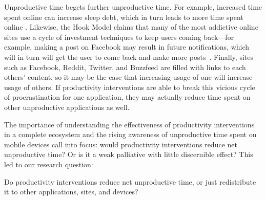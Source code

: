 


Unproductive time begets further unproductive time. For example, increased time spent online can increase sleep debt, which in turn leads to more time spent online \cite{Mark:2016:SDS:2858036.2858437}. Likewise, the Hook Model claims that many of the most addictive online sites use a cycle of investment techniques to keep users coming back---for example, making a post on Facebook may result in future notifications, which will in turn will get the user to come back and make more posts~\cite{eyal2014hooked}. Finally, sites such as Facebook, Reddit, Twitter, and Buzzfeed are filled with links to each others' content, so it may be the case that increasing usage of one will increase usage of others. If productivity interventions are able to break this vicious cycle of procrastination for one application, they may actually reduce time spent on other unproductive applications as well.

The importance of understanding the effectiveness of productivity interventions in a complete ecosystem and the rising awareness of unproductive time spent on mobile devices call into focus: would productivity interventions reduce net unproductive time? Or is it a weak palliative with little discernible effect? This led to our research question:

\begin{resques}[RQ]
Do productivity interventions reduce net unproductive time, or just redistribute it to other applications, sites, and devices?
\end{resques}

